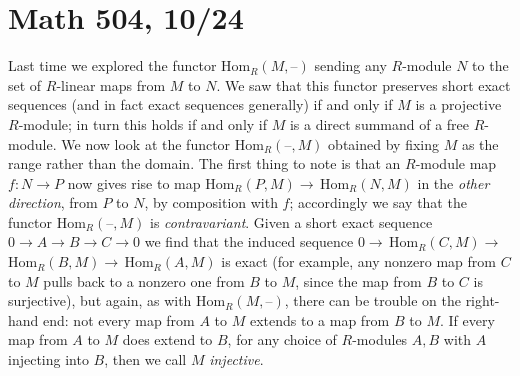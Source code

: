 \documentclass[10pt]{article}
\begin{document}
\section*{Math 504, 10/24}

Last time we explored the functor Hom$_R(M,\text{--})$ sending any
$R$-module $N$ to the set of $R$-linear maps from $M$ to $N$. We saw
that this functor preserves short exact sequences (and in fact exact
sequences generally) if and only if $M$ is a projective $R$-module; in
turn this holds if and only if $M$ is a direct summand of a free
$R$-module. We now look at the functor Hom$_R(\text{--},M)$ obtained by
fixing $M$ as the range rather than the domain. The first thing to note
is that an $R$-module map $f:N\rightarrow P$ now gives rise to map
Hom$_R(P,M)\rightarrow\,$Hom$_R(N,M)$ in the {\sl other direction},
from $P$ to $N$, by composition with $f$; accordingly we say that the
functor Hom$_R(\text{--},M)$ is {\sl contravariant}. Given a short exact
sequence $0\rightarrow A\rightarrow B\rightarrow C\rightarrow 0$ we find
that the induced sequence
$0\rightarrow\,$Hom$_R(C,M)\rightarrow\,$Hom$_R(B,M)\rightarrow\,$Hom$_R(A,M)$
is exact (for example, any nonzero map from $C$ to $M$ pulls back to a
nonzero one from $B$ to $M$, since the map from $B$ to $C$ is
surjective), but again, as with Hom$_R(M,\text{--})$, there can be
trouble on the right-hand end: not every map from $A$ to $M$ extends to
a map from $B$ to $M$. If every map from $A$ to $M$ does extend to $B$,
for any choice of $R$-modules $A,B$ with $A$ injecting into $B$, then we
call $M$ {\sl injective}.
\end{document}
